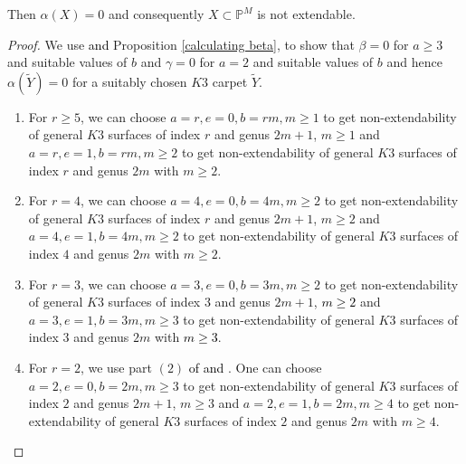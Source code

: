 \documentclass[11pt,twoside]{amsart}
\theoremstyle{plain}
\numberwithin{equation}{section}
\theoremstyle{definition}
\begin{document}
Then $\alpha(X) = 0$ and consequently $X \subset \mathbb{P}^M$ is not extendable.

\begin{proof}
    We use \textcolor{black}{ and} Proposition \ref{calculating beta}, to show that $\beta = 0$ for $a \geq 3$ and suitable values of $b$ and $\gamma = 0$ for $a = 2$ and suitable values of $b$ and hence $\alpha(\widetilde{Y}) = 0$ for a suitably chosen $K3$ carpet $\widetilde{Y}$. 
    \begin{enumerate}
        \item[(1)] For $r \geq 5$, we can choose $a = r, e = 0, b = rm, m \geq 1$ to get non-extendability of general $K3$ surfaces of index $r$ and genus $2m+1$, $m \geq 1$ and $a = r, e = 1, b = rm, m \geq 2$ to get non-extendability of general $K3$ surfaces of index $r$ and genus $2m$ with $m \geq 2$. 

        \smallskip
        
        \item[(2)] For $r = 4$, we can choose $a = 4, e = 0, b = 4m, m \geq 2$ to get non-extendability of general $K3$ surfaces of index $r$ and genus $2m+1$, $m \geq 2$ and $a = 4, e = 1, b = 4m, m \geq 2$ to get non-extendability of general $K3$ surfaces of index $4$ and genus $2m$ with $m \geq 2$. 

       \smallskip
        
        \item[(3)] For $r = 3$, we can choose $a = 3, e = 0, b = 3m, m \geq 2$ to get non-extendability of general $K3$ surfaces of index $3$ and genus $2m+1$, \textcolor{black}{$m \geq 2$} and $a = 3, e = 1, b = 3m, m \geq 3$ to get non-extendability of general $K3$ surfaces of index $3$ and genus $2m$ with \textcolor{black}{$m \geq 3$}. 
        
        \smallskip

        \item[(4)] For $r = 2$, we use part $(2)$ \textcolor{black}{of  and }. One can choose $a = 2, e = 0, b = 2m, m \geq 3$ to get non-extendability of general $K3$ surfaces of index $2$ and genus $2m+1$, $m \geq 3$ and $a = 2, e = 1, b = 2m, m \geq 4$ to get non-extendability of general $K3$ surfaces of index $2$ and genus $2m$ with $m \geq 4$.
       

\end{enumerate}
\end{proof}
\end{document}

